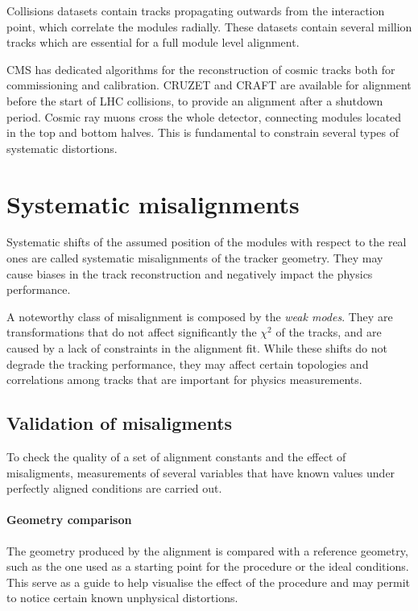 Collisions datasets contain tracks propagating outwards from the interaction point, which correlate the modules radially.
These datasets contain several million tracks which are essential for a full module level alignment.

CMS has dedicated algorithms for the reconstruction of cosmic tracks both for commissioning and calibration.
CRUZET and CRAFT are available for alignment before the start of LHC collisions, to provide an alignment after a shutdown period.
Cosmic ray muons cross the whole detector, connecting modules located in the top and bottom halves.
This is fundamental to constrain several types of systematic distortions.

\section{Systematic misalignments}
Systematic shifts of the assumed position of the modules with respect to the real ones
are called systematic misalignments of the tracker geometry. They
may cause biases in the track reconstruction and negatively impact the physics performance.

A noteworthy class of misalignment is composed by the \textit{weak modes}.
They are transformations that do not affect significantly the $\chi^2$ of the tracks,
and are caused by a lack of constraints in the alignment fit.
While these shifts do not degrade the tracking performance,
they may affect certain topologies and correlations among tracks that are important for physics measurements.

\subsection{Validation of misaligments}
To check the quality of a set of alignment constants and the effect of misaligments,
measurements of several variables that have known values under perfectly aligned conditions are carried out.

\paragraph{Geometry comparison\\}
The geometry produced by the alignment is compared with a reference geometry,
such as the one used as a starting point for the procedure or the ideal conditions.
This serve as a guide to help visualise the effect of the procedure
and may permit to notice certain known unphysical distortions.

